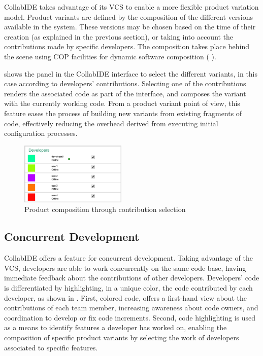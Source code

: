 CollabIDE takes advantage of its \ac{VCS} to enable a more flexible product variation model. Product 
variants are defined by the composition of the different versions available in the system. These 
versions may be chosen based on the time of their creation (as explained in the previous section), or 
taking into account the contributions made by specific developers. The composition takes place 
behind the scene using \ac{COP} facilities for dynamic software composition (\cf 
{}).

 shows the panel in the CollabIDE interface to select the different variants, in this 
case according to developers' contributions. Selecting one of the contributions renders the associated 
code as part of the interface, and composes the variant with the currently working code. From a 
product variant point of view, this feature eases the process of building new variants from existing 
fragments of code, effectively reducing the overhead derived from executing initial configuration 
processes.

\begin{figure}[htbp]
  \centering
  \includegraphics[width=0.45\textwidth]{img/fig3-collabIDEContributionManagement}
  \caption{Product composition through contribution selection}
  \label{fig:contribution}
\end{figure}


\subsection{Concurrent Development}

CollabIDE offers a feature for concurrent development. Taking advantage of the \ac{VCS}, developers 
are able to work concurrently on the same code base, having immediate feedback about the 
contributions of other developers.
Developers' code is differentiated by highlighting, in a unique color, the code contributed by each 
developer, as shown in . First, colored code, offers a first-hand view about the 
contributions of each team member, increasing awareness  about code owners, and coordination to 
develop or fix code increments. Second, code highlighting is used as a means to identify features a 
developer has worked on, enabling the composition of specific product variants by selecting the work 
of developers associated to specific features. 

